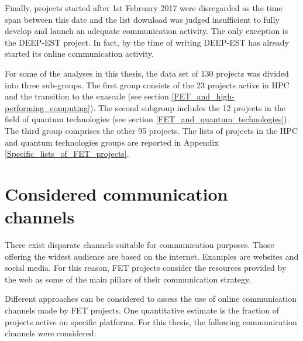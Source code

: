 Finally, projects started after 1st February 2017 were disregarded as the time span between this date and the list download was judged insufficient to fully develop and launch an adequate communication activity. The only exception is the DEEP-EST project. In fact, by the time of writing DEEP-EST has already started its online communication activity.    

For some of the analyses in this thesis, the data set of 130 projects was divided into three sub-groups.  The first group consists of the 23 projects active in HPC and the transition to the exascale (see section \ref{FET_and_high-performing_computing}). The second subgroup includes the 12 projects in the field of quantum technologies (see section \ref{FET_and_quantum_technologies}). The third group comprises the other 95 projects. The lists of projects in the HPC and quantum technologies groups are reported in Appendix \ref{Specific_lists_of_FET_projects}. 

\section{Considered communication channels} \label{Considered_channels}
There exist disparate channels suitable for communication purposes. Those offering the widest audience are based on the internet. Examples are websites and social media. For this reason, FET projects consider the resources provided by the web as some of the main pillars of their communication strategy.

Different approaches can be considered to assess the use of online communication channels made by FET projects. One quantitative estimate is the fraction of projects active on specific platforms. For this thesis, the following communication channels were considered:   

